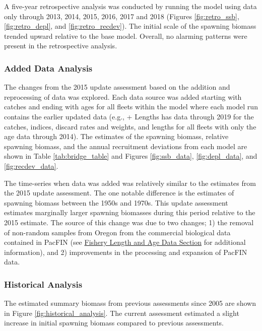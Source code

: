 \documentclass[12pt,]{article}
\begin{document}
A five-year retrospective analysis was conducted by running the model
using data only through 2013, 2014, 2015, 2016, 2017 and 2018 (Figures
\ref{fig:retro_ssb}, \ref{fig:retro_depl}, and \ref{fig:retro_recdev}).
The initial scale of the spawning biomass trended upward relative to the
base model. Overall, no alarming patterns were present in the
retrospective analysis.

\hypertarget{added_data}{\subsubsection{Added Data
Analysis}\label{added_data}}

The changes from the 2015 update assessment based on the addition and
reprocessing of data was explored. Each data source was added starting
with catches and ending with ages for all fleets within the model where
each model run contains the earlier updated data (e.g., + Lengths has
data through 2019 for the catches, indices, discard rates and weights,
and lengths for all fleets with only the age data through 2014). The
estimates of the spawning biomass, relative spawning biomass, and the
annual recruitment deviations from each model are shown in Table
\ref{tab:bridge_table} and Figures \ref{fig:ssb_data},
\ref{fig:depl_data}, and \ref{fig:recdev_data}.

The time-series when data was added was relatively similar to the
estimates from the 2015 update assessment. The one notable difference is
the estimates of spawning biomass between the 1950s and 1970s. This
update assessment estimates marginally larger spawning biomasses during
this period relative to the 2015 estimate. The source of this change was
due to two changes; 1) the removal of non-random samples from Oregon
from the commercial biological data contained in PacFIN (see
\protect\hyperlink{fishery_data}{Fishery Length and Age Data Section}
for additional information), and 2) improvements in the processing and
expansion of PacFIN data.

\subsubsection{Historical Analysis}\label{historical-analysis}

The estimated summary biomass from previous assessments since 2005 are
shown in Figure \ref{fig:historical_analysis}. The current assessment
estimated a slight increase in initial spawning biomass compared to
previous assessments.
\end{document}
